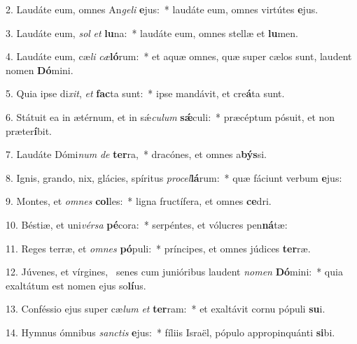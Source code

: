 2. Laudáte eum, omnes An\textit{ge}\textit{li} \textbf{e}jus:~*  laudáte eum, omnes virtútes \textbf{e}jus.\

3. Laudáte eum, \textit{sol} \textit{et} \textbf{lu}na:~*  laudáte eum, omnes stellæ et \textbf{lu}men.\

4. Laudáte eum, cæ\textit{li} \textit{cæ}\textbf{ló}rum:~*  et aquæ omnes, quæ super cælos sunt, laudent nomen \textbf{Dó}mini.\

5. Quia ipse di\textit{xit}, \textit{et} \textbf{fac}ta sunt:~*  ipse mandávit, et cre\textbf{á}ta sunt.\

6. Státuit ea in ætérnum, et in sǽ\textit{cu}\textit{lum} \textbf{sǽ}culi:~*  præcéptum pósuit, et non præter\textbf{í}bit.\

7. Laudáte Dómi\textit{num} \textit{de} \textbf{ter}ra,~*  dracónes, et omnes a\textbf{býs}si.\

8. Ignis, grando, nix, glácies, spíritus \textit{pro}\textit{cel}\textbf{lá}rum:~*  quæ fáciunt verbum \textbf{e}jus:\

9. Montes, et \textit{om}\textit{nes} \textbf{col}les:~*  ligna fructífera, et omnes \textbf{ce}dri.\

10. Béstiæ, et uni\textit{vér}\textit{sa} \textbf{pé}cora:~*  serpéntes, et vólucres pen\textbf{ná}tæ:\

11. Reges terræ, et \textit{om}\textit{nes} \textbf{pó}puli:~*  príncipes, et omnes júdices \textbf{ter}ræ.\

12. Júvenes, et vírgines, \dag\  senes cum junióribus laudent \textit{no}\textit{men} \textbf{Dó}mini:~*  quia exaltátum est nomen ejus so\textbf{lí}us.\

13. Conféssio ejus super cæ\textit{lum} \textit{et} \textbf{ter}ram:~*  et exaltávit cornu pópuli \textbf{su}i.\

14. Hymnus ómnibus \textit{sanc}\textit{tis} \textbf{e}jus:~*  fíliis Israël, pópulo appropinquánti \textbf{si}bi.\

